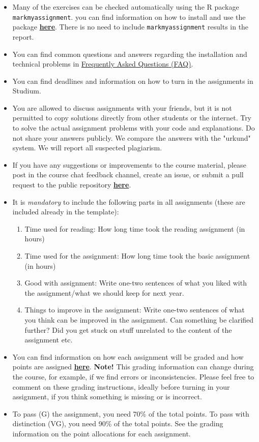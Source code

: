 \begin{itemize}
\begin{enumerate}
\end{enumerate}
\item Many of the exercises can be checked automatically using the R package \\ \texttt{markmyassignment}. you can find information on how to install and use the package \href{https://cran.r-project.org/web/packages/markmyassignment/vignettes/markmyassignment.html}{\textbf{here}}. There is no need to include \texttt{markmyassignment} results in the report.
\item You can find common questions and answers regarding the installation and technical problems in \href{https://github.com/MansMeg/BSDA/blob/main/FAQ.md}{Frequently Asked Questions (FAQ)}.
\item You can find deadlines and information on how to turn in the assignments in Studium.
\item You are allowed to discuss assignments with your friends, but it is not permitted to copy solutions directly from other students or the internet. Try to solve the actual assignment problems with your code and explanations. Do not share your answers publicly. We compare the answers with the "urkund" system. We will report all suspected plagiarism.
\item If you have any suggestions or improvements to the course material, please post in the course chat feedback channel, create an issue, or submit a pull request to the public repository \href{https://github.com/MansMeg/BSDA/issues}{\textbf{here}}.
\item It is \emph{mandatory} to include the following parts in all assignments (these are included already in the template):
\begin{enumerate}
\item Time used for reading: How long time took the reading assignment (in hours)
\item Time used for the assignment: How long time took the basic assignment (in hours)
\item Good with assignment: Write one-two sentences of what you liked with the assignment/what we should keep for next year.
\item Things to improve in the assignment: Write one-two sentences of what you think can be improved in the assignment. Can something be clarified further? Did you get stuck on stuff unrelated to the content of the assignment etc.
\end{enumerate}
\item You can find information on how each assignment will be graded and how points are assigned \href{https://github.com/MansMeg/BSDA/tree/main/grading}{\textbf{here}}. \textbf{Note!} This grading information can change during the course, for example, if we find errors or inconsistencies. Please feel free to comment on these grading instructions, ideally before turning in your assignment, if you think something is missing or is incorrect.
\item To pass (G) the assignment, you need 70\% of the total points. To pass with distinction (VG), you need 90\% of the total points. See the grading information on the point allocations for each assignment.
\end{itemize}


